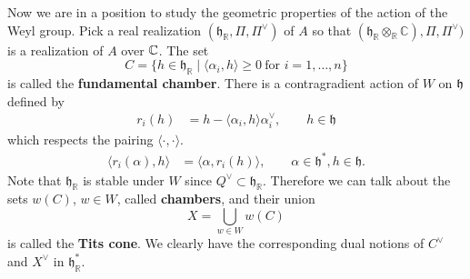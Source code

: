 \documentclass[12pt]{article}
\begin{document}
Now we are in a position to study the geometric properties of the action of the Weyl group.
Pick a real realization $(\mathfrak{h}_{\mathbb{R}},\Pi, \Pi^\vee)$ of $A$ so that $(\mathfrak{h}_{\mathbb{R}} \otimes_{\mathbb{R}} \mathbb{C}), \Pi, \Pi^\vee)$ is a realization of $A$ over $\mathbb{C}$.
The set
\[
    C = \{ h \in \mathfrak{h}_{\mathbb{R}} \mid \langle \alpha_i,h \rangle \geq 0
    \ \text{for } i=1,\dots,n \}
\]
is called the \textbf{fundamental chamber}. There is a contragradient action of $W$ on $\mathfrak{h}$ defined by \begin{align*}
    r_i(h) & = h - \langle \alpha_i,h \rangle \alpha_i^\vee, \qquad h \in \mathfrak{h}
\end{align*} which respects the pairing $\langle \cdot, \cdot \rangle$. \begin{align*}
    \langle r_i(\alpha), h \rangle & = \langle \alpha, r_i(h) \rangle, \qquad \alpha \in \mathfrak{h}^*, h \in \mathfrak{h}.
\end{align*} Note that $\mathfrak{h}_{\mathbb{R}}$ is stable under $W$ since $Q^\vee \subset \mathfrak{h}_{\mathbb{R}}$. Therefore we can talk about the sets $w(C)$, $w\in W$, called \textbf{chambers}, and their union
\[
    X = \bigcup_{w\in W} w(C)
\]
is called the \textbf{Tits cone}. We clearly have the corresponding dual notions of $C^\vee$ and $X^\vee$ in $\mathfrak{h}_{\mathbb{R}}^*$.
\end{document}
